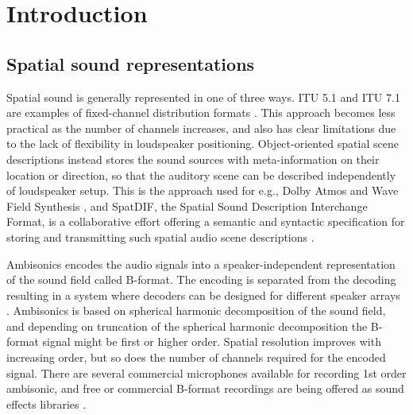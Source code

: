 \documentclass{article}
\title{\papertitle}
\begin{document}
%
\capstartfalse
\maketitle
\capstarttrue




\begin{abstract}
The abstract should be placed at the top left column and should contain about 150–-200 words.
\end{abstract}




\section{Introduction}\label{sec:introduction}

\subsection{Spatial sound representations}

Spatial sound is generally represented in one of three ways.
ITU 5.1 and ITU 7.1 are examples of fixed-channel distribution formats \cite{ITU:1993_surround_5:1}.
This approach becomes less practical as the number of channels increases, and also has clear limitations due to the lack of flexibility in loudspeaker positioning.
Object-oriented spatial scene descriptions instead stores the sound sources with meta-information on their location or direction, so that the auditory scene can be described independently of loudspeaker setup.
This is the approach used for e.g., Dolby Atmos and Wave Field Synthesis \cite{dolby:2014atmos},
and SpatDIF, the Spatial Sound Description Interchange Format, is a collaborative effort offering a semantic and syntactic specification for storing and transmitting such spatial audio scene descriptions \cite{Peters:2013spatdif}.

Ambisonics encodes the audio signals into a speaker-in\-dependent representation of the sound field called B-format.
The encoding is separated from the decoding resulting in a system where decoders can be designed for different speak\-er arrays \cite{Wiggins:2004PhDThesis}.
Ambisonics is based on spherical harmonic decomposition of the sound field, and depending on truncation of the spherical harmonic decomposition the B-for\-mat signal might be first or higher order.
Spatial resolution improves with increasing order, but so does the number of channels required for the encoded signal.
There are several commercial microphones available for recording 1st order ambisonic, and free or commercial B-format recordings are being offered as sound effects libraries \cite{deleflie2014:ambisonia,darcourt:2014surlib}.
\end{document}

